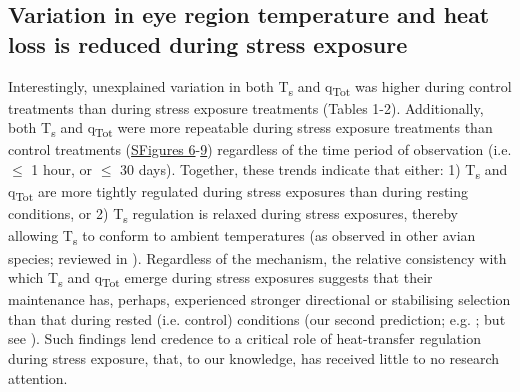 \documentclass[12pt]{article}
\begin{document}
\subsection{Variation in eye region temperature and heat loss is reduced during stress exposure}
\vspace{0.5cm}

\noindent Interestingly, unexplained variation in both T\textsubscript{s} and q\textsubscript{Tot} was higher during control treatments than during stress exposure treatments (Tables 1-2). Additionally, both T\textsubscript{s} and q\textsubscript{Tot} were more repeatable during stress exposure treatments than control treatments (\hyperref[FigC.6]{SFigures 6}-\hyperref[FigC.9]{9}) regardless of the time period of observation (i.e. $\leq$ 1 hour, or $\leq$ 30 days). Together, these trends indicate that either: 1) T\textsubscript{s} and q\textsubscript{Tot} are more tightly regulated during stress exposures than during resting conditions, or 2) T\textsubscript{s} regulation is relaxed during stress exposures, thereby allowing T\textsubscript{s} to conform to ambient temperatures (as observed in other avian species; reviewed in \citealt{angilletta_2019}). Regardless of the mechanism, the relative consistency with which T\textsubscript{s} and q\textsubscript{Tot} emerge during stress exposures suggests that their maintenance has, perhaps, experienced stronger directional or stabilising selection than that during rested (i.e. control) conditions (our second prediction; e.g. \citealt{gibson_1974,lande_1983,vanhomrigh_2007}; but see \citealt{kotiaho_2001}). Such findings lend credence to a critical role of heat-transfer regulation during stress exposure, that, to our knowledge, has received little to no research attention. \vspace{1cm}
\end{document}

